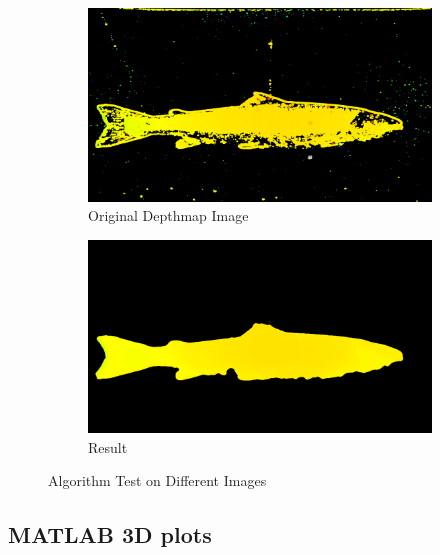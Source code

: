 \begin{figure}[H]
    \medskip
    \begin{subfigure}{0.49\textwidth}
        \includegraphics[width=\linewidth]{images/results/algorithm_test/original_87}
        \caption{Original Depthmap Image} 
        \label{fig:original_depthmap_87}
    \end{subfigure}\hspace*{\fill}
    \begin{subfigure}{0.49\textwidth}
        \includegraphics[width=\linewidth]{images/results/algorithm_test/median_filter_87}
        \caption{Result} 
        \label{fig:result_87}
    \end{subfigure}
    
    \caption{Algorithm Test on Different Images} 
    \label{fig:algorithm_test}
\end{figure}





\subsection{MATLAB 3D plots}

